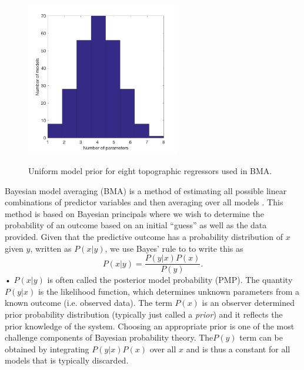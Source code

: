 \documentclass[12pt]{article}
\begin{document}
\begin{figure}
	\centering
	\includegraphics[width = 0.6\textwidth]{DistributionOfNumParams_topoRegress.png}\\
	\caption{Uniform model prior for eight topographic regressors used in BMA.}
	\label{fig:uni_model_prior}
\end{figure}


Bayesian model averaging (BMA) is a method of estimating all possible linear combinations of predictor variables and then averaging over all models \citep{Raftery1997, Wasserman2000, Raftery2005}.  This method is based on Bayesian principals where we wish to determine the probability of an outcome based on an initial ``guess'' as well as the data provided. Given that the predictive outcome has a probability distribution of $x$ given $y$, written as $P(x|y)$, we use Bayes' rule to to write this as
\begin{equation}
P(x|y) = \frac{P(y|x)P(x)}{P(y)}.
\end{equation}•
$P(x|y)$ is often called the posterior model probability (PMP). The quantity $P(y|x)$ is the likelihood function, which determines unknown parameters from a known outcome (i.e. observed data). The term $P(x)$ is an observer determined prior probability distribution (typically just called a \textit{prior}) and it reflects the prior knowledge of the system. Choosing an appropriate prior is one of the most challenge components of Bayesian probability theory. The$P(y)$ term can be obtained by integrating $P(y|x)P(x)$ over all $x$ and is thus a constant for all models that is typically discarded. 
\end{document}
